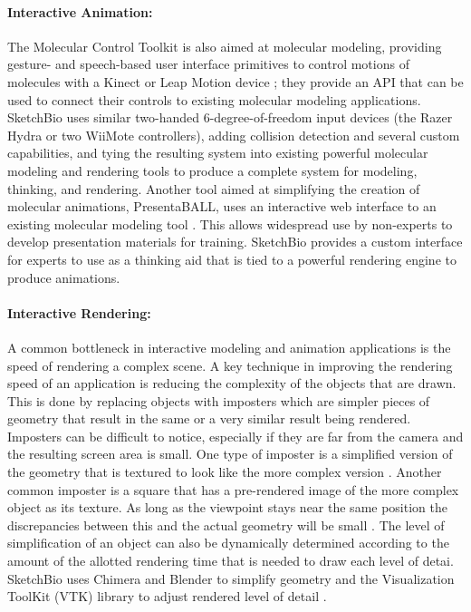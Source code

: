 \documentclass[twocolumn]{bmcart}%
\begin{document}
\paragraph*{Interactive Animation:}
The Molecular Control Toolkit \cite{sabirmolecular} is also aimed at molecular modeling, providing gesture- and speech-based user interface primitives to control motions of molecules with a Kinect or Leap Motion device \cite{sabirmolecular}; they provide an API that can be used to connect their controls to existing molecular modeling applications.  SketchBio uses similar two-handed 6-degree-of-freedom input devices (the Razer Hydra or two WiiMote controllers), adding collision detection and several custom capabilities, and tying the resulting system into existing powerful molecular modeling and rendering tools to produce a complete system for modeling, thinking, and rendering.  Another tool aimed at simplifying the creation of molecular animations, PresentaBALL\cite{nickelspresentaball}, uses an interactive web interface to an existing molecular modeling tool \cite{nickelspresentaball}.  This allows widespread use by non-experts to develop presentation materials for training.  SketchBio provides a custom interface for experts to use as a thinking aid that is tied to a powerful rendering engine to produce animations.

\paragraph*{Interactive Rendering:}
A common bottleneck in interactive modeling and animation applications is the speed of rendering a complex scene.  A key technique in improving the rendering speed of an application is reducing the complexity of the objects that are drawn.  This is done by replacing objects with imposters which are simpler pieces of geometry that result in the same or a very similar result being rendered.  Imposters can be difficult to notice, especially if they are far from the camera and the resulting screen area is small.  One type of imposter is a simplified version of the geometry that is textured to look like the more complex version \cite{decoret2003billboard,erikson1998simplification,cohen1998appearance}.  Another common imposter is a square that has a pre-rendered image of the more complex object as its texture.  As long as the viewpoint stays near the same position the discrepancies between this and the actual geometry will be small \cite{aliaga1996visualization,maciel1995visual}.  The level of simplification of an object can also be dynamically determined according to the amount of the allotted rendering time that is needed to draw each level of detai.  SketchBio uses Chimera and Blender to simplify geometry and the Visualization ToolKit (VTK) library to adjust rendered level of detail \cite{VTKbook}.
\end{document}
